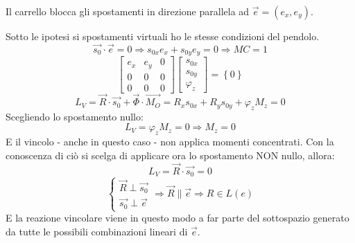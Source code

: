 \documentclass{article}
\begin{document}
\begin{adjustwidth}{2in}{}
\begin{enumerate}
Il carrello blocca gli spostamenti in direzione parallela ad $\vec{e} = (e_{x}, e_{y})$.

Sotto le ipotesi si spostamenti virtuali ho le stesse condizioni del pendolo. 
\[ 
\vec{s_{0}} \cdot \vec{e} = 0 \Rightarrow s_{0x}e_{x} + s_{0y}e_{y} = 0 \Rightarrow MC = 1
\]
\[
\left[\begin{array}{ccc}
	e_{x} & e_{y} & 0 \\
	0 & 0 & 0 \\
	0 & 0 & 0
\end{array}\right] \left[ \begin{array}{c}
	s_{0x} \\
	s_{0y} \\
	\varphi_{z}
\end{array}\right] = \left\lbrace 0 \right\rbrace
\]
\[
L_{V} = \vec{R} \cdot \vec{s_{0}}  + \vec{\Phi} \cdot \vec{M_{O}} = R_{x}s_{0x} + R_{y}s_{0y} + \varphi_{z}M_{z} = 0
\]
Scegliendo lo spostamento nullo: 
\[
L_{V} =  \varphi_{z}M_{z} = 0 \Rightarrow M_{z} = 0
\]
E il vincolo - anche in questo caso - non applica momenti concentrati.
Con la conoscenza di ciò si scelga di applicare ora lo spostamento NON nullo, allora: 
\[
L_{V} = \vec{R} \cdot \vec{s_{0}}  = 0
\] 
\[ 
\begin{cases}
	\vec{R} \perp \vec{s_{0}} \\
	\vec{s_{0}} \perp \vec{e}
\end{cases} \Rightarrow \vec{R} \parallel \vec{e} \Rightarrow R \in L(e)
\]
E la reazione vincolare viene in questo modo a far parte del sottospazio generato da tutte le possibili combinazioni lineari di $\vec{e}$.


\end{enumerate}
\end{adjustwidth}
\end{document}
